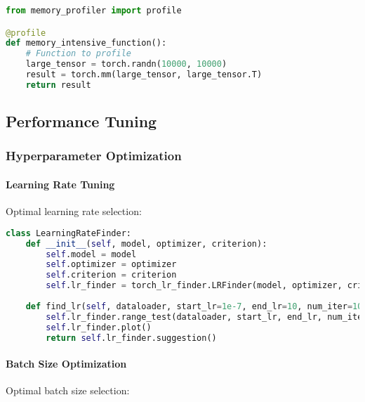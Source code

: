 \begin{lstlisting}[language=python, caption=Memory Profiling]
from memory_profiler import profile

@profile
def memory_intensive_function():
    # Function to profile
    large_tensor = torch.randn(10000, 10000)
    result = torch.mm(large_tensor, large_tensor.T)
    return result
\end{lstlisting}

\subsection{Performance Tuning}

\subsubsection{Hyperparameter Optimization}

\paragraph{Learning Rate Tuning}
Optimal learning rate selection:

\begin{lstlisting}[language=python, caption=Learning Rate Finder]
class LearningRateFinder:
    def __init__(self, model, optimizer, criterion):
        self.model = model
        self.optimizer = optimizer
        self.criterion = criterion
        self.lr_finder = torch_lr_finder.LRFinder(model, optimizer, criterion)
    
    def find_lr(self, dataloader, start_lr=1e-7, end_lr=10, num_iter=100):
        self.lr_finder.range_test(dataloader, start_lr, end_lr, num_iter)
        self.lr_finder.plot()
        return self.lr_finder.suggestion()
\end{lstlisting}

\paragraph{Batch Size Optimization}
Optimal batch size selection:

